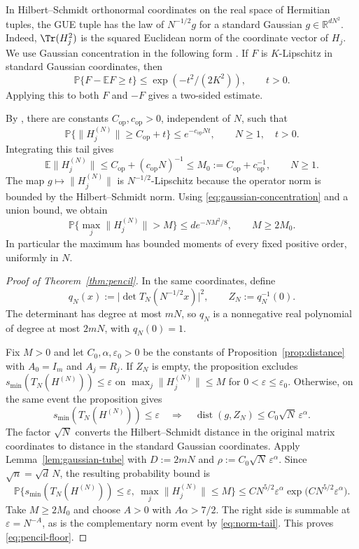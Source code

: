 In Hilbert--Schmidt orthonormal coordinates on the real space of Hermitian tuples, the GUE tuple has the law of \(N^{-1/2}g\) for a standard Gaussian \(g\in\mathbb R^{dN^2}\).
Indeed, \(\Tr(H_j^2)\) is the squared Euclidean norm of the coordinate vector of \(H_j\).
We use Gaussian concentration in the following form \cite[Proposition~4.4 of arXiv v1]{CGP22}.
If \(F\) is \(K\)-Lipschitz in standard Gaussian coordinates, then
\begin{equation}\label{eq:gaussian-concentration}
 \mathbb P\{F-\mathbb EF\ge t\}\le \exp(-t^2/(2K^2)),\qquad t>0.
\end{equation}
Applying this to both \(F\) and \(-F\) gives a two-sided estimate.

By \cite[Proposition~2.11 of arXiv v1]{CGP22}, there are constants \(C_{\mathrm{op}},c_{\mathrm{op}}>0\), independent of \(N\), such that
\[
 \mathbb P\{\|H_j^{(N)}\|\ge C_{\mathrm{op}}+t\}
 \le e^{-c_{\mathrm{op}}Nt},\qquad N\ge1,\quad t>0.
\]
Integrating this tail gives
\[
 \mathbb E\|H_j^{(N)}\|\le C_{\mathrm{op}}+(c_{\mathrm{op}}N)^{-1}
 \le M_0:=C_{\mathrm{op}}+c_{\mathrm{op}}^{-1},\qquad N\ge1.
\]
The map \(g\mapsto\|H_j^{(N)}\|\) is \(N^{-1/2}\)-Lipschitz because the operator norm is bounded by the Hilbert--Schmidt norm.
Using \eqref{eq:gaussian-concentration} and a union bound, we obtain
\begin{equation}\label{eq:norm-tail}
 \mathbb P\{\max_j\|H_j^{(N)}\|>M\}\le d e^{-NM^2/8},
 \qquad M\ge 2M_0 .
\end{equation}
In particular the maximum has bounded moments of every fixed positive order, uniformly in \(N\).

\begin{proof}[Proof of Theorem~\ref{thm:pencil}]
In the same coordinates, define
\[
  q_N(x):=\bigl|\det T_N(N^{-1/2}x)\bigr|^2,
  \qquad Z_N:=q_N^{-1}(0).
\]
The determinant has degree at most \(mN\), so \(q_N\) is a nonnegative real polynomial of degree at most \(2mN\), with \(q_N(0)=1\).

Fix \(M>0\) and let \(C_0,\alpha,\varepsilon_0>0\) be the constants of Proposition~\ref{prop:distance} with \(A_0=I_m\) and \(A_j=R_j\).
If \(Z_N\) is empty, the proposition excludes \(s_{\min}(T_N(H^{(N)}))\le\varepsilon\) on \(\max_j\|H_j^{(N)}\|\le M\) for \(0<\varepsilon\le\varepsilon_0\).
Otherwise, on the same event the proposition gives
\[
  s_{\min}(T_N(H^{(N)}))\le\varepsilon
  \quad\Longrightarrow\quad
  \operatorname{dist}(g,Z_N)\le C_0\sqrt N\,\varepsilon^\alpha.
\]
The factor \(\sqrt N\) converts the Hilbert--Schmidt distance in the original matrix coordinates to distance in the standard Gaussian coordinates.
Apply Lemma~\ref{lem:gaussian-tube} with \(D:=2mN\) and \(\rho:=C_0\sqrt N\,\varepsilon^\alpha\).
Since \(\sqrt n=\sqrt d\,N\), the resulting probability bound is
\[
  \mathbb P\bigl\{s_{\min}(T_N(H^{(N)}))\le\varepsilon,\
                 \max_j\|H_j^{(N)}\|\le M\bigr\}
  \le C N^{5/2}\varepsilon^\alpha
      \exp\bigl(CN^{5/2}\varepsilon^\alpha\bigr).
\]
Take \(M\ge 2M_0\) and choose \(A>0\) with \(A\alpha>7/2\).
The right side is summable at \(\varepsilon=N^{-A}\), as is the complementary norm event by \eqref{eq:norm-tail}.
This proves \eqref{eq:pencil-floor}.
\end{proof}
